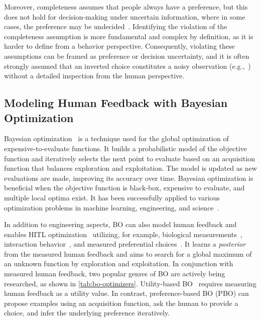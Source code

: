 \documentclass[acmsmall,screen,nonacm]{acmart}
\begin{document}
Moreover, completeness assumes that people always have a preference, but this does not hold for decision-making under uncertain information, where in some cases, the preference may be undecided~\cite{ok2012incomplete}. Identifying the violation of the completeness assumption is more fundamental and complex by definition, as it is harder to define from a behavior perspective.
%
Consequently, violating these assumptions can be framed as preference or decision uncertainty, and it is often strongly assumed that an inverted choice constitutes a noisy observation (e.g.,~\cite{gonzalez2017pbo, lin2022preference, pfannschmidt2022learning, benavoli2021choice}) without a detailed inspection from the human perspective.

\subsection{Modeling Human Feedback with Bayesian Optimization}
\label{sec:bo}
Bayesian optimization~\cite{močkus1975on} is a technique used for the global optimization of expensive-to-evaluate functions. It builds a probabilistic model of the objective function and iteratively selects the next point to evaluate based on an acquisition function that balances exploration and exploitation. The model is updated as new evaluations are made, improving its accuracy over time. Bayesian optimization is beneficial when the objective function is black-box, expensive to evaluate, and multiple local optima exist. It has been successfully applied to various optimization problems in machine learning, engineering, and science~\cite{shahriari2016bo-review}.

In addition to engineering aspects, BO can also model human feedback and enables HITL optimization~\cite{shahriari2016bo-review} utilizing, for example, biological measurements~\cite{kim2017human, ding2018human}, interaction behavior~\cite{chong2021interactive}, and measured preferential choices~\cite{brochu2007active, gonzalez2017pbo, koyama2017sequential}. It learns a \emph{posterior} from the measured human feedback and aims to search for a global maximum of an unknown function by exploration and exploitation. In conjunction with measured human feedback, two popular genres of BO are actively being researched, as shown in \autoref{tab:bo-optimizers}.
%
Utility-based BO~\cite{močkus1975on} requires measuring human feedback as a utility value. In contrast, preference-based BO (PBO) can propose examples using an acquisition function, ask the human to provide a choice, and infer the underlying preference iteratively.
\end{document}
